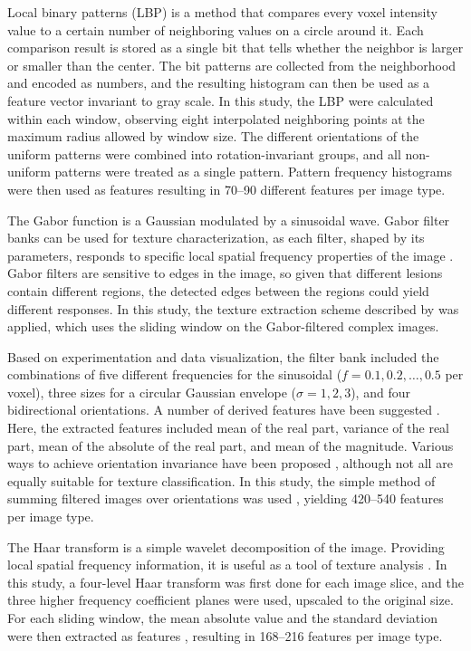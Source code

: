 Local binary patterns (LBP) \citep{Ojala1996} is a method that compares every
voxel intensity value to a certain number of neighboring values on a circle
around it. Each comparison result is stored as a single bit that tells whether
the neighbor is larger or smaller than the center. The bit patterns are
collected from the neighborhood and encoded as numbers, and the resulting
histogram can then be used as a feature vector invariant to gray scale. In this
study, the LBP were calculated within each window, observing eight interpolated
neighboring points at the maximum radius allowed by window size. The different
orientations of the uniform patterns were combined into rotation-invariant
groups, and all non-uniform patterns were treated as a single pattern. Pattern
frequency histograms were then used as features resulting in 70--90 different
features per image type.

The Gabor function \citep{Gabor1946} is a Gaussian modulated by a sinusoidal
wave. Gabor filter banks can be used for texture characterization, as each
filter, shaped by its parameters, responds to specific local spatial frequency
properties of the image \citep{Turner1986}. Gabor filters are sensitive to edges
in the image, so given that different lesions contain different regions, the
detected edges between the regions could yield different responses. In this
study, the texture extraction scheme described by \citet{Tuceryan1998} was
applied, which uses the sliding window on the Gabor-filtered complex images.

Based on experimentation and data visualization, the filter bank included the
combinations of five different frequencies for the sinusoidal
($f=0.1,0.2,…,0.5$ per voxel), three sizes for a circular Gaussian
envelope ($\sigma=1,2,3$), and four bidirectional orientations. A number of
derived features have been suggested \citep{Clausi2000, Hammouda2000,
Grigorescu2002}. Here, the extracted features included mean of the real part,
variance of the real part, mean of the absolute of the real part, and mean of
the magnitude. Various ways to achieve orientation invariance have been proposed
\citep{Arivazhagan2006, Han2007, Chu2009, Rahman2011}, although not all are
equally suitable for texture classification. In this study, the simple method of
summing filtered images over orientations was used \citep{Han2007}, yielding
420--540 features per image type.

The Haar transform is a simple wavelet decomposition of the image. Providing
local spatial frequency information, it is useful as a tool of texture analysis
\citep{Lonnestad1992}. In this study, a four-level Haar transform was first done
for each image slice, and the three higher frequency coefficient planes were
used, upscaled to the original size. For each sliding window, the mean absolute
value and the standard deviation were then extracted as features
\citep{Lonnestad1992}, resulting in 168--216 features per image type.


